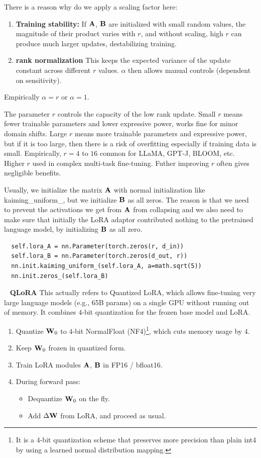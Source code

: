 \documentclass[11pt]{article}  %
\begin{document}
There is a reason why do we apply a scaling factor here:
\begin{enumerate}
  \item \textbf{Training stability:} If $\mathbf{A}$, $\mathbf{B}$ are initialized with small random values, the magnitude of their product varies with $r$, and without scaling, high $r$ can produce much larger updates, destabilizing training. 
  \item \textbf{rank normalization} This keeps the expected variance of the update constant across different $r$ values. 
  $\alpha$ then allows manual controls (dependent on sensitivity).
\end{enumerate}
Empirically $\alpha = r$ or $\alpha = 1$.

The parameter $r$ controls the capacity of the low rank update.
Small $r$ means fewer trainable parameters and lower expressive power, works fine for minor domain shifts.
Large $r$ means more trainable parameters and expressive power, but if it is too large, then there is a risk of overfitting especially if training data is small. 
Empirically, $r = 4$ to $16$ common for LLaMA, GPT-J, BLOOM, etc.
Higher $r$ used in complex multi-task fine-tuning.
Futher improving $r$ often gives negligible benefits.

Usually, we initialize the matrix $\mathbf{A}$ with normal initialization like kaiming\_uniform\_, but we initialize $\mathbf{B}$ as all zeros.
The reason is that we need to prevent the activations we get from $\mathbf{A}$ from collapsing and we also need to make sure that initially the LoRA adaptor contributed nothing to the pretrained language model, by initializing $\mathbf{B}$ as all zero.
\begin{verbatim}
  self.lora_A = nn.Parameter(torch.zeros(r, d_in))
  self.lora_B = nn.Parameter(torch.zeros(d_out, r))
  nn.init.kaiming_uniform_(self.lora_A, a=math.sqrt(5))
  nn.init.zeros_(self.lora_B)
\end{verbatim}


\textbullet~ \textbf{QLoRA}
This actually refers to Quantized LoRA, which allows fine-tuning very large language models (e.g., 65B params) on a single GPU without running out of memory.
It combines $4$-bit quantization for the frozen base model and LoRA.

\begin{enumerate}
  \item Quantize $\mathbf{W}_0$ to $4$-bit NormalFloat (NF4)\footnote{It is a $4$-bit quantization scheme that preserves more precision than plain int4 by using a learned normal distribution mapping.}, which cuts memory usage by $4$.
  \item Keep $\mathbf{W}_0$ frozen in quantized form.
  \item Train LoRA modules $\mathbf{A}$, $\mathbf{B}$ in FP16 / bfloat16.
  \item During forward pass: \begin{itemize}
    \item Dequantize $\mathbf{W}_0$ on the fly.
    \item Add $\Delta \mathbf{W}$ from LoRA, and proceed as usual.
  \end{itemize}
\end{enumerate}
\end{document}
